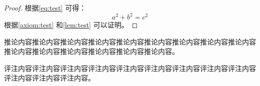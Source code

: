 \begin{proof}
    根据\cref{eq:test} 可得：
    \begin{equation}
        a^2 + b^2 = c^2
        \label{eq:test2}
    \end{equation}
    根据\cref{axiom:test} 和\cref{lem:test} 可以证明。
\end{proof}

\begin{corollary}[推论环境测试]
    推论内容推论内容推论内容推论内容推论内容推论内容推论内容推论内容推论内容推论内容推论内容推论内容推论内容推论内容推论内容。
    \label{cor:test}
\end{corollary}

\begin{remark}
    评注内容评注内容评注内容评注内容评注内容评注内容评注内容评注内容评注内容评注内容评注内容评注内容。
    \label{rem:test}
\end{remark}